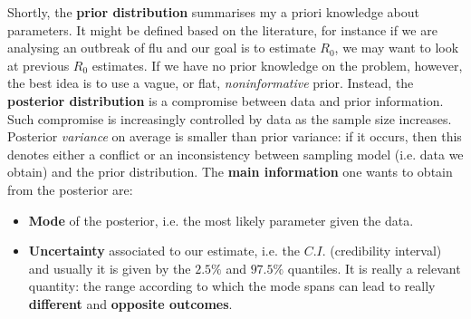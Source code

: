 \documentclass[../main/main.tex]{subfiles}
\begin{document}
Shortly, the \textbf{prior distribution} summarises my a priori knowledge about parameters. It might be defined based on the literature, for instance if we are analysing an outbreak of flu and our goal is to estimate $R_0$, we may want to look at previous $R_0$ estimates. If we have no prior knowledge on the problem, however, the best idea is to use a vague, or flat, \textit{noninformative} prior. Instead, the \textbf{posterior distribution} is a compromise between data and prior information. Such compromise is increasingly controlled by data as the sample size increases. Posterior \textit{variance} on average is smaller than prior variance: if it occurs, then this denotes either a conflict or an inconsistency between sampling model (i.e. data we obtain) and the prior distribution. The \textbf{main information} one wants to obtain from the posterior are:
\begin{itemize}
    \item \textbf{Mode} of the posterior, i.e. the most likely parameter given the data.
    \item \textbf{Uncertainty} associated to our estimate, i.e. the $C.I.$ (credibility interval) and usually it is given by the $2.5\%$ and $97.5\%$ quantiles. It is really a relevant quantity: the range according to which the mode spans can lead to really \textbf{different} and \textbf{opposite outcomes}.
\end{itemize}
\end{document}
